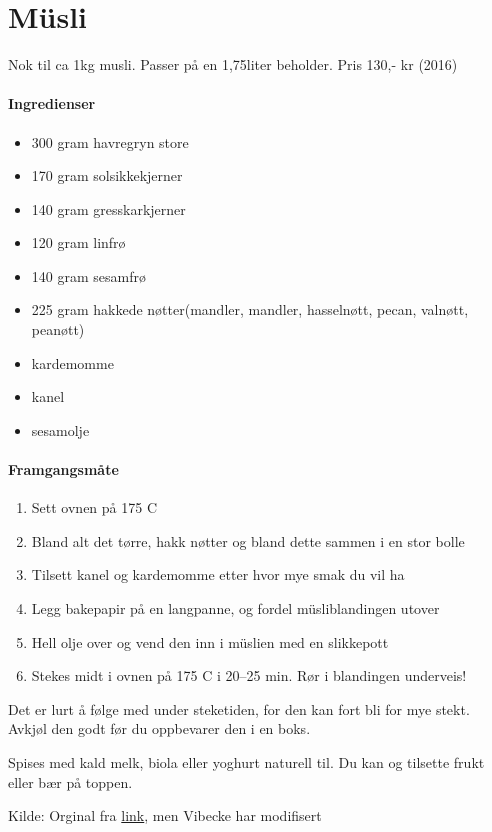 \section{﻿Müsli}
Nok til ca 1kg musli. Passer på en 1,75liter beholder.
Pris 130,- kr (2016)

\paragraph{Ingredienser}
\begin{itemize}[noitemsep]
	\item 300 gram havregryn store
	\item 170 gram solsikkekjerner
	\item 140 gram gresskarkjerner
	\item 120 gram linfrø
	\item 140 gram sesamfrø
	\item 225 gram hakkede nøtter(mandler, mandler, hasselnøtt, pecan, valnøtt, peanøtt)
	\item kardemomme
	\item kanel
	\item sesamolje
\end{itemize}

\paragraph{Framgangsmåte}
\begin{enumerate}[noitemsep]
	\item	Sett ovnen på 175 \degree C
	\item	Bland alt det tørre, hakk nøtter og bland dette sammen i en stor bolle
	\item	Tilsett kanel og kardemomme etter hvor mye smak du vil ha
	\item	Legg bakepapir på en langpanne, og fordel müsliblandingen utover
	\item	Hell olje over og vend den inn i müslien med en slikkepott
	\item	Stekes midt i ovnen på 175 \degree C i 20--25 min. Rør i blandingen underveis!
\end{enumerate}


Det er lurt å følge med under steketiden, for den kan fort bli for mye stekt.
Avkjøl den godt før du oppbevarer den i en boks.

Spises med kald melk, biola eller yoghurt naturell til. Du kan og tilsette frukt eller bær på toppen.

Kilde: Orginal fra \href{http://www.karolinegrovdal.no/?p=305}{link}, men Vibecke har modifisert

